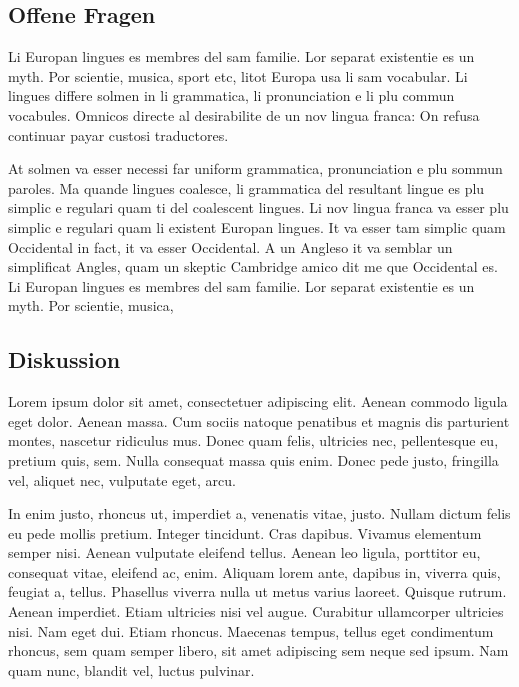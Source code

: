 \documentclass[paper=a4,fontsize=12pt,ngerman]{scrartcl}
\begin{document}
\subsection{Offene Fragen}
Li Europan lingues es membres del sam familie. Lor separat existentie es un 
myth. Por scientie, musica, sport etc, litot Europa usa li sam vocabular. Li 
lingues differe solmen in li grammatica, li pronunciation e li plu commun 
vocabules. Omnicos directe al desirabilite de un nov lingua franca: On refusa 
continuar payar custosi traductores.

At solmen va esser necessi far uniform grammatica, pronunciation e plu sommun 
paroles. Ma quande lingues coalesce, li grammatica del resultant lingue es 
plu simplic e regulari quam ti del coalescent lingues. Li nov lingua franca 
va esser plu simplic e regulari quam li existent Europan lingues. It va esser 
tam simplic quam Occidental in fact, it va esser Occidental. A un Angleso it 
va semblar un simplificat Angles, quam un skeptic Cambridge amico dit me que 
Occidental es. Li Europan lingues es membres del sam familie. Lor separat 
existentie es un myth. Por scientie, musica,

\subsection{Diskussion}
Lorem ipsum dolor sit amet, consectetuer adipiscing elit. Aenean commodo 
ligula eget dolor. Aenean massa. Cum sociis natoque penatibus et magnis dis 
parturient montes, nascetur ridiculus mus. Donec quam felis, ultricies nec, 
pellentesque eu, pretium quis, sem. Nulla consequat massa quis enim. Donec 
pede justo, fringilla vel, aliquet nec, vulputate eget, arcu.

In enim justo, rhoncus ut, imperdiet a, venenatis vitae, justo. Nullam dictum 
felis eu pede mollis pretium. Integer tincidunt. Cras dapibus. Vivamus 
elementum semper nisi. Aenean vulputate eleifend tellus. Aenean leo ligula, 
porttitor eu, consequat vitae, eleifend ac, enim. Aliquam lorem ante, dapibus 
in, viverra quis, feugiat a, tellus. Phasellus viverra nulla ut metus varius 
laoreet. Quisque rutrum. Aenean imperdiet. Etiam ultricies nisi vel augue. 
Curabitur ullamcorper ultricies nisi. Nam eget dui. Etiam rhoncus. Maecenas 
tempus, tellus eget condimentum rhoncus, sem quam semper libero, sit amet 
adipiscing sem neque sed ipsum. Nam quam nunc, blandit vel, luctus pulvinar.

\clearpage
\renewcommand\refname{Literaturverzeichnis}


\end{document}
